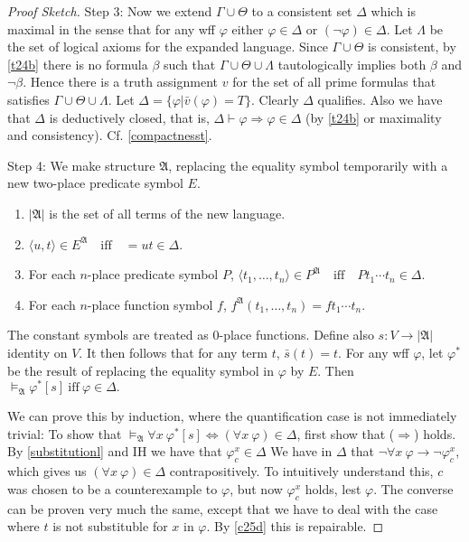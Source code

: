 \begin{proof}[Proof Sketch]
  Step 3: Now we extend $\Gamma\cup\Theta$ to a consistent set $\Delta$ which is maximal in the sense that for any wff $\varphi$ either $\varphi\in \Delta$ or $(\neg \varphi)\in \Delta$. Let $\Lambda$ be the set of logical axioms for the expanded language. Since $\Gamma\cup\Theta$ is consistent, by \ref{t24b} there is no formula $\beta$ such that $\Gamma\cup\Theta\cup \Lambda$ tautologically implies both $\beta$ and $\neg \beta$. Hence there is a truth assignment $v$ for the set of all prime formulas that satisfies $\Gamma\cup\Theta\cup \Lambda$. Let $\Delta=\{\varphi|\bar{v}(\varphi)=T\}.$ Clearly $\Delta$ qualifies. Also we have that $\Delta$ is deductively closed, that is, $\Delta\vdash \varphi\Rightarrow \varphi\in \Delta$ (by \ref{t24b} or maximality and consistency). Cf. \ref{compactnesst}.

  Step 4: We make structure $\mathfrak{A}$, replacing the equality symbol temporarily with a new two-place predicate symbol $E$.
  \begin{enumerate}[label=(\alph*)]
    \item $|\mathfrak{A}|$ is the set of all terms of the new language.
    \item $\langle u,t\rangle\in E^{\mathfrak{A}}\quad\text{iff}\quad =ut\in \Delta$.
    \item For each $n$-place predicate symbol $P$, $\langle t_1,\dots,t_n\rangle\in P^{\mathfrak{A}}\quad\text{iff}\quad Pt_1\cdots t_n\in\Delta$.
    \item For each $n$-place function symbol $f$, $f^{\mathfrak{A}}(t_1,\dots,t_n)=ft_1\cdots t_n$.
  \end{enumerate}
  The constant symbols are treated as $0$-place functions. Define also $s:V\rightarrow|\mathfrak{A}|$ identity on $V$. It then follows that for any term $t$, $\bar{s}(t)=t$. For any wff $\varphi$, let $\varphi^*$ be the result of replacing the equality symbol in $\varphi$ by $E$. Then $\vDash_{\mathfrak{A}}\varphi^*[s]\ \text{iff}\ \varphi\in \Delta.$

  We can prove this by induction, where the quantification case is not immediately trivial: To show that $\vDash_{\mathfrak{A}}\forall x\ \varphi^*[s]\Leftrightarrow(\forall x\ \varphi)\in \Delta$, first show that ($\Rightarrow$) holds. By \ref{substitutionl} and IH we have that $\varphi_c^x\in \Delta$ We have in $\Delta$ that $\neg\forall x\ \varphi\rightarrow\neg \varphi_c^x$, which gives us $(\forall x\ \varphi)\in \Delta$ contrapositively. To intuitively understand this, $c$ was chosen to be a counterexample to $\varphi$, but now $\varphi_c^x$ holds, lest $\varphi$. The converse can be proven very much the same, except that we have to deal with the case where $t$ is not substituble for $x$ in $\varphi$. By \ref{c25d} this is repairable.


\end{proof}
